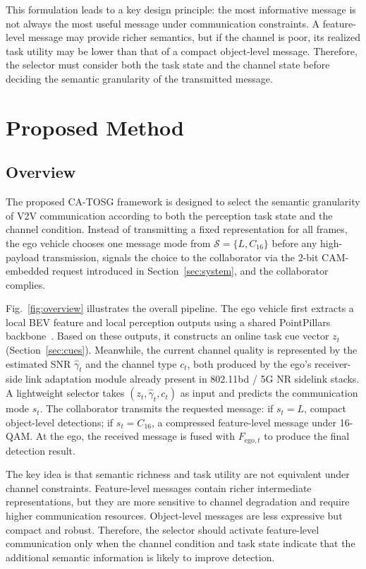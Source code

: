 \documentclass[journal]{IEEEtran}
\newcommand{\method}{CA-TOSG}
\begin{document}
This formulation leads to a key design principle: the most informative message is not always the most useful message under communication constraints. A feature-level message may provide richer semantics, but if the channel is poor, its realized task utility may be lower than that of a compact object-level message. Therefore, the selector must consider both the task state and the channel state before deciding the semantic granularity of the transmitted message.

\section{Proposed Method}\label{sec:method}

\subsection{Overview}

The proposed \method{} framework is designed to select the semantic granularity of V2V communication according to both the perception task state and the channel condition. Instead of transmitting a fixed representation for all frames, the ego vehicle chooses one message mode from $\mathcal{S}=\{L,C_{16}\}$ before any high-payload transmission, signals the choice to the collaborator via the $2$-bit CAM-embedded request introduced in Section~\ref{sec:system}, and the collaborator complies.

Fig.~\ref{fig:overview} illustrates the overall pipeline. The ego vehicle first extracts a local BEV feature and local perception outputs using a shared PointPillars backbone~\cite{lang2019pointpillars}. Based on these outputs, it constructs an online task cue vector $z_t$ (Section~\ref{sec:cues}). Meanwhile, the current channel quality is represented by the estimated SNR $\hat\gamma_t$ and the channel type $c_t$, both produced by the ego's receiver-side link adaptation module already present in 802.11bd / 5G NR sidelink stacks. A lightweight selector takes $(z_t,\hat\gamma_t,c_t)$ as input and predicts the communication mode $s_t$. The collaborator transmits the requested message: if $s_t=L$, compact object-level detections; if $s_t=C_{16}$, a compressed feature-level message under 16-QAM. At the ego, the received message is fused with $F_{\mathrm{ego},t}$ to produce the final detection result.

The key idea is that semantic richness and task utility are not equivalent under channel constraints. Feature-level messages contain richer intermediate representations, but they are more sensitive to channel degradation and require higher communication resources. Object-level messages are less expressive but compact and robust. Therefore, the selector should activate feature-level communication only when the channel condition and task state indicate that the additional semantic information is likely to improve detection.
\end{document}
